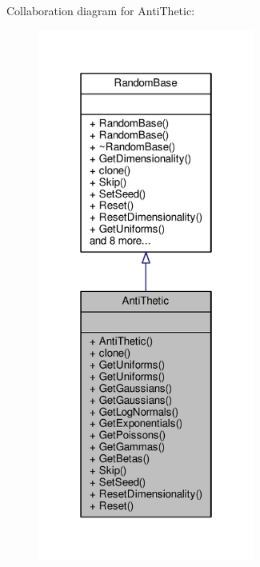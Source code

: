 Collaboration diagram for Anti\+Thetic\+:
\nopagebreak
\begin{figure}[H]
\begin{center}
\leavevmode
\includegraphics[width=202pt]{classAntiThetic__coll__graph}
\end{center}
\end{figure}

